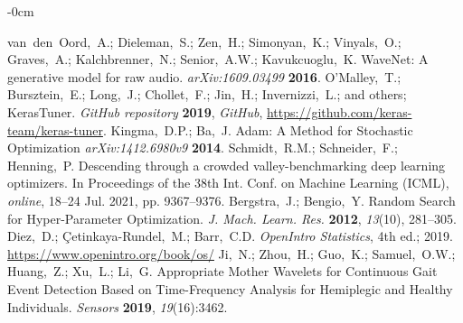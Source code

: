 \documentclass[sensors,article,submit,pdftex,moreauthors]{Definitions/mdpi}
\begin{document}
\begin{adjustwidth}{-\extralength}{0cm}
\begin{thebibliography}{999}
	van~den~Oord,~A.; Dieleman,~S.; Zen,~H.; Simonyan,~K.; Vinyals,~O.; Graves,~A.; Kalchbrenner,~N.; Senior,~A.W.; Kavukcuoglu,~K. WaveNet: A generative model for raw audio. {\em arXiv:1609.03499} {\bf 2016}.
	O'Malley,~T.; Bursztein,~E.; Long,~J.; Chollet,~F.; Jin,~H.; Invernizzi,~L.; and others; KerasTuner. {\em GitHub repository} {\bf 2019}, {\em GitHub}, \url{https://github.com/keras-team/keras-tuner}.
	Kingma,~D.P.; Ba,~J. Adam: A Method for Stochastic Optimization {\em arXiv:1412.6980v9} {\bf 2014}.
	Schmidt,~R.M.; Schneider,~F.; Henning,~P. Descending through a crowded valley-benchmarking deep learning optimizers. In Proceedings of the 38th Int. Conf. on Machine Learning (ICML), {\em online}, 18--24 Jul. 2021, pp. 9367--9376.
	Bergstra,~J.; Bengio,~Y. Random Search for Hyper-Parameter Optimization. {\em J. Mach. Learn. Res.} {\bf 2012}, {\em 13}(10), 281--305.
	Diez,~D.; \c{C}etinkaya-Rundel,~M.; Barr,~C.D. \textit{OpenIntro Statistics}, 4th ed.; 2019. \url{https://www.openintro.org/book/os/}
	Ji,~N.; Zhou,~H.; Guo,~K.; Samuel,~O.W.; Huang,~Z.; Xu,~L.; Li,~G. Appropriate Mother Wavelets for Continuous Gait Event Detection Based on Time-Frequency Analysis for Hemiplegic and Healthy Individuals. {\em Sensors} {\bf 2019}, {\em 19}(16):3462.
	
\end{thebibliography}

%


\end{adjustwidth}
\end{document}
